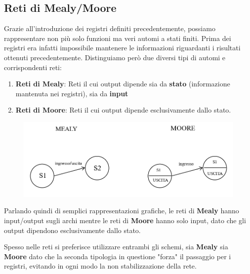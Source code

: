 \documentclass{article}
\begin{document}
\newpage

\subsection{Reti di Mealy/Moore}

Grazie all'introduzione dei registri definiti precedentemente, possiamo rappresentare non più solo funzioni ma veri automi a stati finiti.
Prima dei registri era infatti impossibile mantenere le informazioni riguardanti i risultati ottenuti precedentemente. Distinguiamo però due diversi tipi di automi e corrispondenti reti:

\vspace*{20px}

\begin{enumerate}
    \item \textbf{Reti di Mealy}: Reti il cui output dipende sia da \textbf{stato} (informazione mantenuta nei registri), sia da \textbf{input}
    \item \textbf{Reti di Moore}: Reti il cui output dipende esclusivamente dallo stato.
\end{enumerate}

\vspace*{15px}

\begin{figure}[htbp]
    \includegraphics[scale=0.5]{img/mealy_moore.png}
    \centering
\end{figure}

\vspace*{15px}

Parlando quindi di semplici rappresentazioni grafiche, le reti di \textbf{Mealy} hanno input/output sugli archi mentre le reti di \textbf{Moore} hanno solo input, dato che gli output dipendono esclusivamente dallo stato.

\vspace*{20px}

Spesso nelle reti si preferisce utilizzare entrambi gli schemi, sia \textbf{Mealy} sia \textbf{Moore} dato che la seconda tipologia in questione "forza" il passaggio per i registri, evitando in ogni modo la non stabilizzazione della rete.
\end{document}
